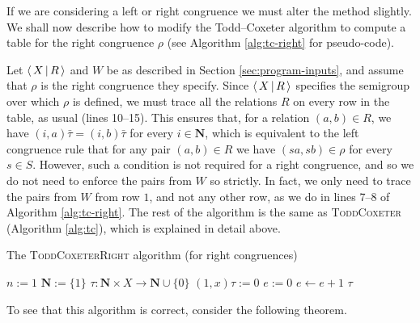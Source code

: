 If we are considering a left or right congruence we
must alter the method slightly.  We shall now describe how to modify
the Todd--Coxeter algorithm to compute a table for the right congruence $\rho$ (see Algorithm
\ref{alg:tc-right} for pseudo-code).

Let $\left\langle \, X \, \middle| \, R \, \right\rangle$ and $W$ be as described in Section \ref{sec:program-inputs}, and
assume that $\rho$ is the right congruence they specify.  Since
$\left\langle \, X \, \middle| \, R \, \right\rangle$ specifies the semigroup over which $\rho$ is defined, we must trace
all the relations $R$ on every row in the table, as usual (lines 10--15).  This ensures that,
for a relation $(a,b) \in R$, we have $(i, a)\bar\tau = (i, b)\bar\tau$ for
every $i \in \mathbf{N}$, which is equivalent to the left congruence rule that
for any pair $(a,b) \in R$ we have $(sa, sb) \in \rho$ for every $s \in S$.
However, such a condition is not required for a right congruence, and so we do
not need to enforce the pairs from $W$ so strictly.  In fact, we only need to
trace the pairs from $W$ from row $1$, and not any other row, as we do in lines 7--8
of Algorithm \ref{alg:tc-right}.
The rest of the algorithm is the same as \textsc{ToddCoxeter} (Algorithm
\ref{alg:tc}), which is explained in detail above.

\begin{algorithm}
\caption{The \textsc{ToddCoxeterRight} algorithm (for right congruences)}
\label{alg:tc-right}
\begin{algorithmic}[1]
\State $n := 1$
\State $\mathbf{N} := \{1\}$
\State $\tau : \mathbf{N} \times X \to \mathbf{N} \cup \{0\}$
  \State $(1, x)\tau := 0$
\EndFor
{}
  \State {}
\EndFor
\State $e := 0$
\Repeat
  \State $e \gets e + 1$
      \State {}
    \EndFor
  \EndIf
{}  
\State \Return $\tau$
\EndProcedure
\end{algorithmic}
\end{algorithm}

To see that this algorithm is correct, consider the following theorem.

